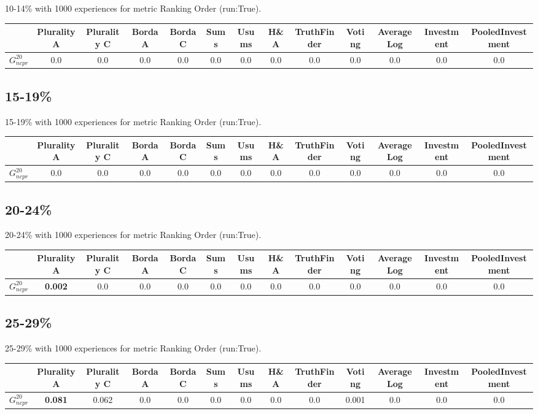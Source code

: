 \documentclass{article}
\newcommand{\graph}[2]{$G_{#1}^{#2}$}
\begin{document}
10-14\% with 1000 experiences for metric Ranking Order (run:True).

\noindent\begin{tabular}{|l|c|c|c|c|c|c|c|c|c|c|c|c|}
\hline
& Plurality A& Plurality C& Borda A& Borda C& Sums& Usums& H\&A& TruthFinder& Voting& AverageLog& Investment& PooledInvestment\\
\hline
\graph{ncpr}{20} &0.0&0.0&0.0&0.0&0.0&0.0&0.0&0.0&0.0&0.0&0.0&0.0\\
\hline
\end{tabular}
\newpage

\subsection{15-19\%}

15-19\% with 1000 experiences for metric Ranking Order (run:True).

\noindent\begin{tabular}{|l|c|c|c|c|c|c|c|c|c|c|c|c|}
\hline
& Plurality A& Plurality C& Borda A& Borda C& Sums& Usums& H\&A& TruthFinder& Voting& AverageLog& Investment& PooledInvestment\\
\hline
\graph{ncpr}{20} &0.0&0.0&0.0&0.0&0.0&0.0&0.0&0.0&0.0&0.0&0.0&0.0\\
\hline
\end{tabular}
\newpage

\subsection{20-24\%}

20-24\% with 1000 experiences for metric Ranking Order (run:True).

\noindent\begin{tabular}{|l|c|c|c|c|c|c|c|c|c|c|c|c|}
\hline
& Plurality A& Plurality C& Borda A& Borda C& Sums& Usums& H\&A& TruthFinder& Voting& AverageLog& Investment& PooledInvestment\\
\hline
\graph{ncpr}{20} &\textbf{0.002}&0.0&0.0&0.0&0.0&0.0&0.0&0.0&0.0&0.0&0.0&0.0\\
\hline
\end{tabular}
\newpage

\subsection{25-29\%}

25-29\% with 1000 experiences for metric Ranking Order (run:True).

\noindent\begin{tabular}{|l|c|c|c|c|c|c|c|c|c|c|c|c|}
\hline
& Plurality A& Plurality C& Borda A& Borda C& Sums& Usums& H\&A& TruthFinder& Voting& AverageLog& Investment& PooledInvestment\\
\hline
\graph{ncpr}{20} &\textbf{0.081}&0.062&0.0&0.0&0.0&0.0&0.0&0.0&0.001&0.0&0.0&0.0\\
\hline
\end{tabular}
\newpage
\end{document}
